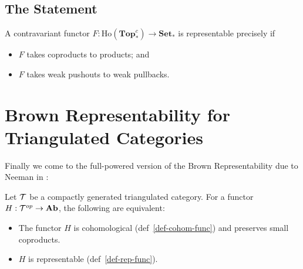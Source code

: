 \documentclass[12pt]{article}
\newcommand*{\pTopc}{\mathbf{Top}_\ast^c}
\begin{document}
\subsection{The Statement}
\begin{thm}
	A contravariant functor $F:\text{Ho}(\pTopc)\to\mathbf{Set}_\ast$ is representable precisely if 
	\begin{itemize}
		\item $F$ takes coproducts to products; and 
		\item $F$ takes weak pushouts to weak pullbacks.
	\end{itemize}
\end{thm}

\section{Brown Representability for Triangulated Categories}
Finally we come to the full-powered version of the Brown Representability due to Neeman in \cite{neeman-article}:
\begin{thm}[Brown]
	Let $\mathcal{T}$ be a compactly generated triangulated category. For a functor $H:\mathcal{T}^{op}\to\mathbf{Ab}$, the following 
	are equivalent:
	\begin{itemize}
		\item The functor $H$ is cohomological (def~\ref{def-cohom-func}) and preserves small coproducts.
		\item $H$ is representable (def~\ref{def-rep-func}).
	\end{itemize}
\end{thm}

\medskip

\printbibliography
\end{document}

